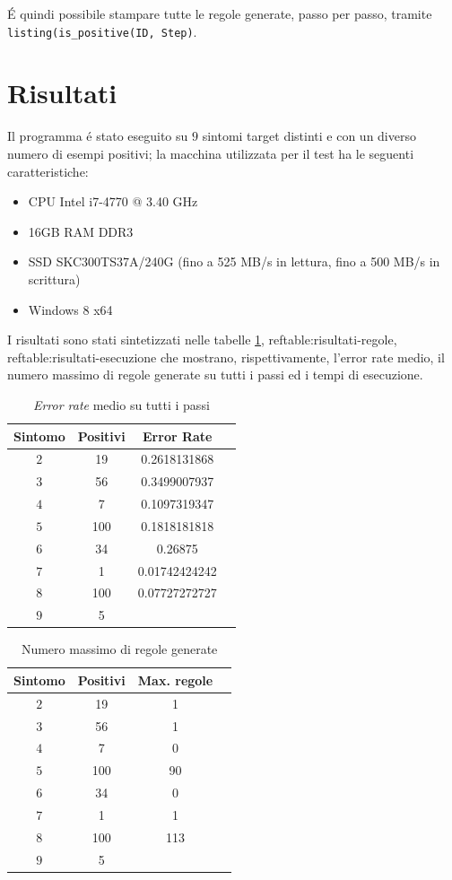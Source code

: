 \documentclass[preprint]{acm_proc_article-sp}
\begin{document}
\'E quindi possibile stampare tutte le regole generate, passo per passo, tramite \verb|listing(is_positive(ID, Step)|.

\section{Risultati}
Il programma \'e stato eseguito su $9$ sintomi target distinti e con un diverso numero di esempi positivi; la macchina utilizzata per il test ha le seguenti caratteristiche:
\begin{itemize}
\item CPU Intel i7-4770 @ 3.40 GHz
\item 16GB RAM DDR3
\item SSD SKC300TS37A/240G (fino a 525 MB/s in lettura, fino a 500 MB/s in scrittura)
\item Windows 8 x64
\end{itemize}

I risultati sono stati sintetizzati nelle tabelle \ref{table:risultati-errori}, ref{table:risultati-regole}, ref{table:risultati-esecuzione} che mostrano, rispettivamente, l'error rate medio, il numero massimo di regole generate su tutti i passi ed i tempi di esecuzione.

\begin{table}[h]
\centering
\begin{tabular}{|c|c|c|c|} \hline
\textbf{Sintomo} & \textbf{Positivi} & \textbf{Error Rate} \\ \hline \hline
$2$ & 19 & 0.2618131868 \\ \hline
$3$ & 56 & 0.3499007937 \\ \hline
$4$ & 7 & 0.1097319347 \\ \hline
$5$ & 100 & 0.1818181818 \\ \hline
$6$ & 34 & 0.26875 \\ \hline
$7$ & 1 & 0.01742424242 \\ \hline
$8$ & 100 & 0.07727272727 \\ \hline
$9$ & 5 &  \\
\hline\end{tabular}
\caption{\textit{Error rate} medio su tutti i passi}
\label{table:risultati-errori}
\end{table}

\begin{table}[h]
\centering
\begin{tabular}{|c|c|c|c|} \hline
\textbf{Sintomo} & \textbf{Positivi} & \textbf{Max. regole} \\ \hline \hline
$2$ & 19 & 1 \\ \hline
$3$ & 56 & 1 \\ \hline
$4$ & 7 & 0 \\ \hline
$5$ & 100 & 90 \\ \hline
$6$ & 34 & 0 \\ \hline
$7$ & 1 & 1 \\ \hline
$8$ & 100 & 113 \\ \hline
$9$ & 5 &  \\
\hline\end{tabular}
\caption{Numero massimo di regole generate}
\label{table:risultati-regole}
\end{table}
\end{document}
